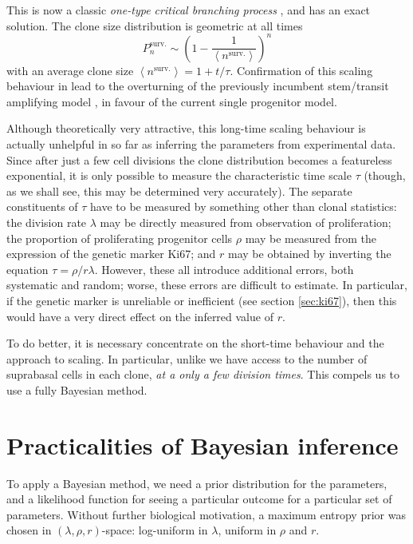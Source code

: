 \documentclass[10pt,english]{report}
\begin{document}
This is now a classic \emph{one-type critical branching process} \citep{athreya&ney}, and has an exact solution. The clone size distribution is geometric at all times $$P^\textrm{surv.}_n \sim \left(1-\frac{1}{\left\langle n^\textrm{surv.} \right\rangle}\right)^n$$ with an average clone size $\left\langle n^\textrm{surv.} \right\rangle = 1 + t/\tau$. Confirmation of this scaling behaviour in \citet{clayton} lead to the overturning of the previously incumbent stem/transit amplifying model \citep{stemta1,stemta2,stemta3}, in favour of the current single progenitor model.

Although theoretically very attractive, this long-time scaling behaviour is actually unhelpful in so far as inferring the parameters from experimental data. Since after just a few cell divisions the clone distribution becomes a featureless exponential, it is only possible to measure the characteristic time scale $\tau$ (though, as we shall see, this may be determined very accurately). The separate constituents of $\tau$ have to be measured by something other than clonal statistics: the division rate $\lambda$ may be directly measured from observation of proliferation; the proportion of proliferating progenitor cells $\rho$ may be measured from the expression of the genetic marker Ki67; and $r$ may be obtained by inverting the equation $\tau = \rho/r\lambda$. However, these all introduce additional errors, both systematic and random; worse, these errors are difficult to estimate. In particular, if the genetic marker is unreliable or inefficient (see section \ref{sec:ki67}), then this would have a very direct effect on the inferred value of $r$.

To do better, it is necessary concentrate on the short-time behaviour and the approach to scaling. In particular, unlike \citet{clayton} we have access to the number of suprabasal cells in each clone, \emph{at a only a few division times}. This compels us to use a fully Bayesian method.

\section{Practicalities of Bayesian inference}

To apply a Bayesian method, we need a prior distribution for the parameters, and a likelihood function for seeing a particular outcome for a particular set of parameters. Without further biological motivation, a maximum entropy prior was chosen in $(\lambda, \rho, r)$-space: log-uniform in $\lambda$, uniform in $\rho$ and $r$. 
\end{document}
